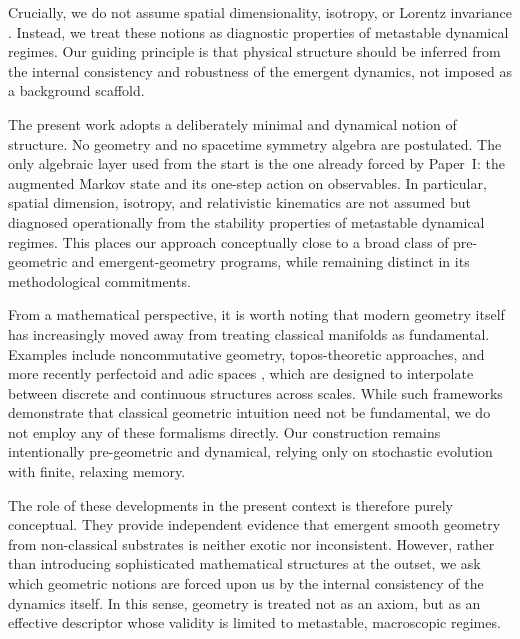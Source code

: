 \documentclass[reprint,amsmath,amssymb,aps,prl,nofootinbib,floatfix]{revtex4-2}
\begin{document}
Crucially, we do not assume spatial dimensionality, isotropy, or Lorentz invariance \cite{Liberati2013Lorentz}. Instead, we treat these notions as diagnostic properties of metastable dynamical regimes. Our guiding principle is that physical structure should be inferred from the internal consistency and robustness of the emergent dynamics, not imposed as a background scaffold.

The present work adopts a deliberately minimal and dynamical notion of structure. No geometry and no spacetime symmetry algebra are postulated. The only algebraic layer used from the start is the one already forced by Paper~I: the augmented Markov state and its one-step action on observables. In particular, spatial dimension, isotropy, and relativistic kinematics are not assumed but diagnosed operationally from the stability properties of metastable dynamical regimes. This places our approach conceptually close to a broad class of pre-geometric and emergent-geometry programs, while remaining distinct in its methodological commitments.

From a mathematical perspective, it is worth noting that modern geometry itself has increasingly moved away from treating classical manifolds as fundamental. Examples include noncommutative geometry, topos-theoretic approaches, and more recently perfectoid and adic spaces \cite{Scholze2012Perfectoid}, which are designed to interpolate between discrete and continuous structures across scales. While such frameworks demonstrate that classical geometric intuition need not be fundamental, we do not employ any of these formalisms directly. Our construction remains intentionally pre-geometric and dynamical, relying only on stochastic evolution with finite, relaxing memory.

The role of these developments in the present context is therefore purely conceptual. They provide independent evidence that emergent smooth geometry from non-classical substrates is neither exotic nor inconsistent. However, rather than introducing sophisticated mathematical structures at the outset, we ask which geometric notions are forced upon us by the internal consistency of the dynamics itself. In this sense, geometry is treated not as an axiom, but as an effective descriptor whose validity is limited to metastable, macroscopic regimes.
\end{document}
